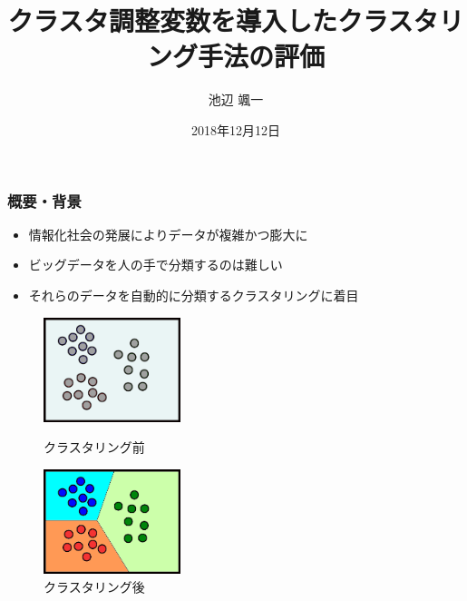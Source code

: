 \documentclass[13pt,dvipdfmx]{beamer}
\title{クラスタ調整変数を導入したクラスタリング手法の評価}
\author{池辺 颯一}
\institute{芝浦工業大学 工学部 通信工学科}
\date{2018年12月12日}
\begin{document}
\begin{frame}\frametitle{}
 \titlepage
\end{frame}

\begin{frame}\frametitle{概要・背景}
\begin{itemize}
 \item 情報化社会の発展によりデータが複雑かつ膨大に
 \item ビッグデータを人の手で分類するのは難しい
 \item それらのデータを自動的に分類するクラスタリングに着目
\end{itemize}
\vspace{5mm}
\begin{figure}[htbp]
 \begin{minipage}{0.4\hsize}
  \begin{center}
   \includegraphics[width=40mm]{before_clustering.png}
  \end{center}
  \captionsetup{labelformat=empty,labelsep=none}
  \caption{クラスタリング前}
  \label{fig:one}
 \end{minipage}
\hspace{1cm}
 \begin{minipage}{0.4\hsize}
  \begin{center}
   \includegraphics[width=40mm]{after_clustering.png}
  \end{center}
  \captionsetup{labelformat=empty,labelsep=none}
  \caption{クラスタリング後}
  \label{fig:two}
 \end{minipage}
\end{figure}
\end{frame}
\end{document}
